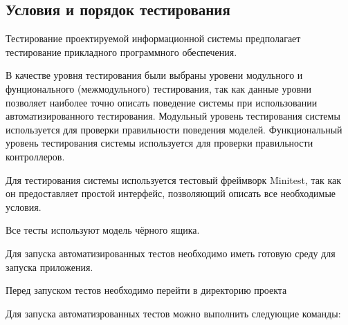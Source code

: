 \subsection{Условия и порядок тестирования}

Тестирование проектируемой информационной системы предполагает тестирование прикладного программного обеспечения.

В качестве уровня тестирования были выбраны уровени модульного и фунционального (межмодульного) тестирования, так как данные уровни позволяет наиболее точно описать поведение системы при использовании автоматизированного тестирования. Модульный уровень тестирования системы используется для проверки правильности поведения моделей. Функциональный уровень тестирования системы используется для проверки правильности контроллеров.

Для тестирования системы используется тестовый фреймворк Minitest, так как он предоставляет простой интерфейс, позволяющий описать все необходимые условия.

Все тесты используют модель чёрного ящика.

Для запуска автоматизированных тестов необходимо иметь готовую среду для запуска приложения.

Перед запуском тестов необходимо перейти в директорию проекта

Для запуска автоматизрованных тестов можно выполнить следующие команды:

